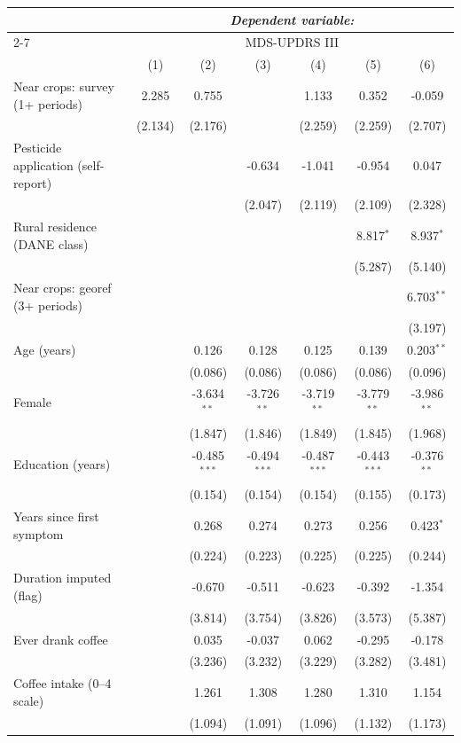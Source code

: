 \begin{tabular}{lcccccc}
\hline\hline
 & \multicolumn{6}{c}{\textit{Dependent variable:}} \\
\cline{2-7}
 & \multicolumn{6}{c}{MDS-UPDRS III} \\
 & (1) & (2) & (3) & (4) & (5) & (6) \\
\hline
Near crops: survey (1+ periods) & 2.285 & 0.755 &  & 1.133 & 0.352 & -0.059 \\
 & (2.134) & (2.176) &  & (2.259) & (2.259) & (2.707) \\
Pesticide application (self-report) &  &  & -0.634 & -1.041 & -0.954 & 0.047 \\
 &  &  & (2.047) & (2.119) & (2.109) & (2.328) \\
Rural residence (DANE class) &  &  &  &  & 8.817$^{*}$ & 8.937$^{*}$ \\
 &  &  &  &  & (5.287) & (5.140) \\
Near crops: georef (3+ periods) &  &  &  &  &  & 6.703$^{**}$ \\
 &  &  &  &  &  & (3.197) \\
Age (years) &  & 0.126 & 0.128 & 0.125 & 0.139 & 0.203$^{**}$ \\
 &  & (0.086) & (0.086) & (0.086) & (0.086) & (0.096) \\
Female &  & -3.634$^{**}$ & -3.726$^{**}$ & -3.719$^{**}$ & -3.779$^{**}$ & -3.986$^{**}$ \\
 &  & (1.847) & (1.846) & (1.849) & (1.845) & (1.968) \\
Education (years) &  & -0.485$^{***}$ & -0.494$^{***}$ & -0.487$^{***}$ & -0.443$^{***}$ & -0.376$^{**}$ \\
 &  & (0.154) & (0.154) & (0.154) & (0.155) & (0.173) \\
Years since first symptom &  & 0.268 & 0.274 & 0.273 & 0.256 & 0.423$^{*}$ \\
 &  & (0.224) & (0.223) & (0.225) & (0.225) & (0.244) \\
Duration imputed (flag) &  & -0.670 & -0.511 & -0.623 & -0.392 & -1.354 \\
 &  & (3.814) & (3.754) & (3.826) & (3.573) & (5.387) \\
Ever drank coffee &  & 0.035 & -0.037 & 0.062 & -0.295 & -0.178 \\
 &  & (3.236) & (3.232) & (3.229) & (3.282) & (3.481) \\
Coffee intake (0--4 scale) &  & 1.261 & 1.308 & 1.280 & 1.310 & 1.154 \\
 &  & (1.094) & (1.091) & (1.096) & (1.132) & (1.173) \\

\end{tabular}
